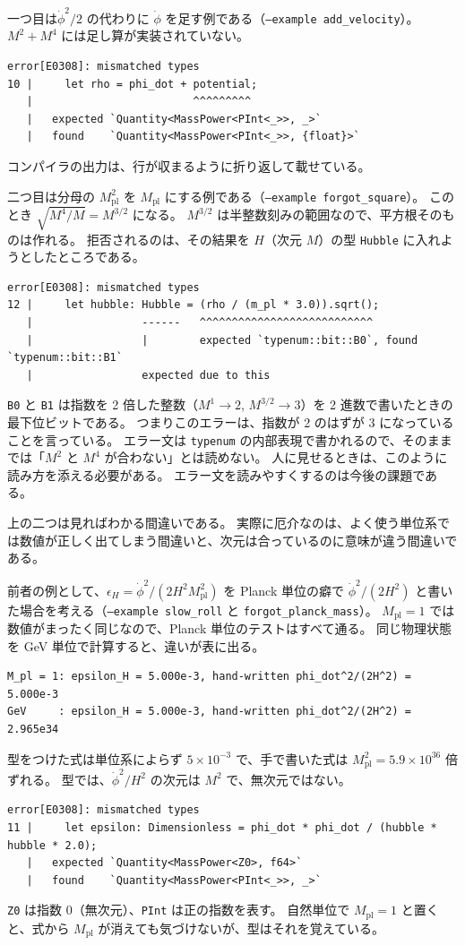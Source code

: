 \documentclass[a4paper,11pt]{ltjsarticle}
\newcommand{\Mpl}{M_{\mathrm{pl}}}
\newcommand{\code}[1]{\texttt{#1}}
\begin{document}
一つ目は$\dot\phi^2/2$ の代わりに $\dot\phi$ を足す例である（\code{--example add\_velocity}）。
$M^2+M^4$ には足し算が実装されていない。
\begin{lstlisting}[language={}]
error[E0308]: mismatched types
10 |     let rho = phi_dot + potential;
   |                         ^^^^^^^^^
   |   expected `Quantity<MassPower<PInt<_>>, _>`
   |   found    `Quantity<MassPower<PInt<_>>, {float}>`
\end{lstlisting}
コンパイラの出力は、行が収まるように折り返して載せている。

二つ目は分母の $\Mpl^2$ を $\Mpl$ にする例である（\code{--example forgot\_square}）。
このとき $\sqrt{M^4/M}=M^{3/2}$ になる。
$M^{3/2}$ は半整数刻みの範囲なので、平方根そのものは作れる。
拒否されるのは、その結果を $H$（次元 $M$）の型 \code{Hubble} に入れようとしたところである。
\begin{lstlisting}[language={}]
error[E0308]: mismatched types
12 |     let hubble: Hubble = (rho / (m_pl * 3.0)).sqrt();
   |                 ------   ^^^^^^^^^^^^^^^^^^^^^^^^^^^
   |                 |        expected `typenum::bit::B0`, found `typenum::bit::B1`
   |                 expected due to this
\end{lstlisting}
\code{B0} と \code{B1} は指数を 2 倍した整数（$M^1\to2$, $M^{3/2}\to3$）を 2 進数で書いたときの最下位ビットである。
つまりこのエラーは、指数が 2 のはずが 3 になっていることを言っている。
エラー文は \code{typenum} の内部表現で書かれるので、そのままでは「$M^2$ と $M^4$ が合わない」とは読めない。
人に見せるときは、このように読み方を添える必要がある。
エラー文を読みやすくするのは今後の課題である。

上の二つは見ればわかる間違いである。
実際に厄介なのは、よく使う単位系では数値が正しく出てしまう間違いと、次元は合っているのに意味が違う間違いである。

前者の例として、$\epsilon_H=\dot\phi^2/(2H^2\Mpl^2)$ を Planck 単位の癖で $\dot\phi^2/(2H^2)$ と書いた場合を考える（\code{--example slow\_roll} と \code{forgot\_planck\_mass}）。
$\Mpl=1$ では数値がまったく同じなので、Planck 単位のテストはすべて通る。
同じ物理状態を GeV 単位で計算すると、違いが表に出る。
\begin{lstlisting}[language={}]
M_pl = 1: epsilon_H = 5.000e-3, hand-written phi_dot^2/(2H^2) = 5.000e-3
GeV     : epsilon_H = 5.000e-3, hand-written phi_dot^2/(2H^2) = 2.965e34
\end{lstlisting}
型をつけた式は単位系によらず $5\times10^{-3}$ で、手で書いた式は $\Mpl^2=5.9\times10^{36}$ 倍ずれる。
型では、$\dot\phi^2/H^2$ の次元は $M^2$ で、無次元ではない。
\begin{lstlisting}[language={}]
error[E0308]: mismatched types
11 |     let epsilon: Dimensionless = phi_dot * phi_dot / (hubble * hubble * 2.0);
   |   expected `Quantity<MassPower<Z0>, f64>`
   |   found    `Quantity<MassPower<PInt<_>>, _>`
\end{lstlisting}
\code{Z0} は指数 0（無次元）、\code{PInt} は正の指数を表す。
自然単位で $\Mpl=1$ と置くと、式から $\Mpl$ が消えても気づけないが、型はそれを覚えている。
\end{document}
